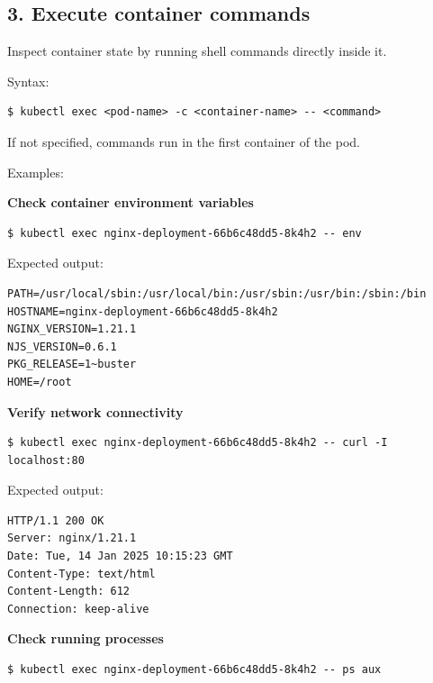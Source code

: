 \documentclass{article}
\begin{document}
\subsection*{3. Execute container commands}

Inspect container state by running shell commands directly inside it.

Syntax:

\begin{lstlisting}[style=bash]
$ kubectl exec <pod-name> -c <container-name> -- <command>
\end{lstlisting}

\begin{tcolorbox}[colback=blue!5!white,colframe=blue!75!black,title=Note]
If not specified, commands run in the first container of the pod.
\end{tcolorbox}

Examples:

\textbf{Check container environment variables}

\begin{lstlisting}[style=bash]
$ kubectl exec nginx-deployment-66b6c48dd5-8k4h2 -- env
\end{lstlisting}

Expected output:

\begin{lstlisting}[style=bash]
PATH=/usr/local/sbin:/usr/local/bin:/usr/sbin:/usr/bin:/sbin:/bin
HOSTNAME=nginx-deployment-66b6c48dd5-8k4h2
NGINX_VERSION=1.21.1
NJS_VERSION=0.6.1
PKG_RELEASE=1~buster
HOME=/root
\end{lstlisting}

\textbf{Verify network connectivity}

\begin{lstlisting}[style=bash]
$ kubectl exec nginx-deployment-66b6c48dd5-8k4h2 -- curl -I localhost:80
\end{lstlisting}

Expected output:

\begin{lstlisting}[style=bash]
HTTP/1.1 200 OK
Server: nginx/1.21.1
Date: Tue, 14 Jan 2025 10:15:23 GMT
Content-Type: text/html
Content-Length: 612
Connection: keep-alive
\end{lstlisting}

\textbf{Check running processes}

\begin{lstlisting}[style=bash]
$ kubectl exec nginx-deployment-66b6c48dd5-8k4h2 -- ps aux
\end{lstlisting}
\end{document}
